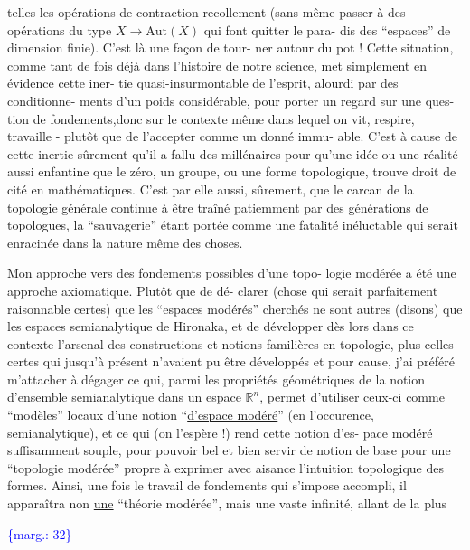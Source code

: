 \documentclass[11pt]{article}
\newcommand{\scanpage}[1]{\par\bigskip\noindent{\small\sffamily[scan #1]}\par}
\newcommand{\mspage}[1]{{\small\sffamily[p.\,#1]}}
\newcommand{\margin}[1]{\textcolor{blue}{\{\textsf{marg.:} #1\}}}
\newcommand{\uline}[1]{\underline{#1}}
\begin{document}
telles les opérations de contraction-recollement (sans même passer
à des opérations du type $X \longrightarrow \mathrm{Aut}(X)$ qui font quitter le para-%
dis des ``espaces'' de dimension finie). C'est là une façon de tour-%
ner autour du pot ! Cette situation, comme tant de fois déjà dans
l'histoire de notre science, met simplement en évidence cette iner-%
tie quasi-insurmontable de l'esprit, alourdi par des conditionne-%
ments d'un poids considérable, pour porter un regard sur une ques-%
tion de fondements,donc sur le contexte même dans lequel on vit,
respire, travaille - plutôt que de l'accepter comme un donné immu-%
able. C'est à cause de cette inertie sûrement qu'il a fallu des
millénaires pour qu'une idée ou une réalité aussi enfantine que
le zéro, un groupe, ou une forme topologique, trouve droit de cité
en mathématiques. C'est par elle aussi, sûrement, que le carcan
de la topologie générale continue à être traîné patiemment par
des générations de topologues, la ``sauvagerie'' étant portée comme
une fatalité inéluctable qui serait enracinée dans la nature même
des choses.

Mon approche vers des fondements possibles d'une topo-%
logie modérée a été une approche axiomatique. Plutôt que de dé-%
clarer (chose qui serait parfaitement raisonnable certes) que
les ``espaces modérés'' cherchés ne sont autres (disons) que les
espaces semianalytique de Hironaka, et de développer dès lors dans
ce contexte l'arsenal des constructions et notions familières en
topologie, plus celles certes qui jusqu'à présent n'avaient pu
être développés et pour cause, j'ai préféré m'attacher à dégager
ce qui, parmi les propriétés géométriques de la notion d'ensemble
semianalytique dans un espace $\mathbb{R}^{n}$, permet d'utiliser ceux-ci comme
``modèles'' locaux d'une notion ``\uline{d'espace modéré}'' (en l'occurence,
semianalytique), et ce qui (on l'espère !) rend cette notion d'es-%
pace modéré suffisamment souple, pour pouvoir bel et bien servir
de notion de base pour une ``topologie modérée'' propre à exprimer
avec aisance l'intuition topologique des formes. Ainsi, une fois
le travail de fondements qui s'impose accompli, il apparaîtra non
\uline{une} ``théorie modérée'', mais une vaste infinité, allant de la plus

\margin{32}

\clearpage
\scanpage{119/33}
\mspage{31}
\end{document}
